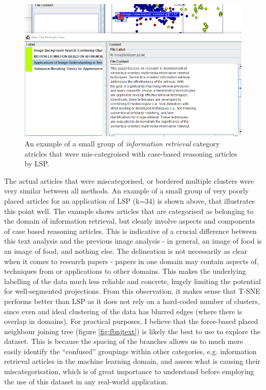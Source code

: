 \documentclass[ 10pt ]{fphw}
\begin{document}
\begin{center}
\begin{figure}[H]
    \centering
	\includegraphics[width=0.85\columnwidth]{example overlap text lsp.png} 
	\caption{An example of a small group of \textit{information retrieval} category atricles that were mis-categroised with case-based reasoning articles by LSP.}
	\label{fig:mixeduptext}
	\end{figure}
\end{center}

The actual articles that were miscategorised, or bordered multiple clusters were very similar between all methods. An example of a small group of very poorly placed articles for an application of LSP (k=34) is shown above, that illustrates this point well. The example shows articles that are categorised as belonging to the domain of information retrieval, but clearly involve aspects and components of case based reasoning articles. This is indicative of a crucial difference between this text analysis and the previous image analysis - in general, an image of food is an image of food, and nothing else. The delineation is not necessarily as clear when it comes to research papers - papers in one domain may contain aspects of, techniques from or applications to other domains. This makes the underlying labelling of the data much less reliable and concrete, hugely limiting the potential for well-segmented projections. From this observation, it makes sense that T-SNE performs better than LSP as it does not rely on a hard-coded number of clusters, since even and ideal clustering of the data has blurred edges (where there is overlap in domains). For practical purposes, I believe that the force-based placed neighbour joining tree (figure \ref{fig:fbnjtext}) is likely the best to use to explore the dataset. This is because the spacing of the branches allows us to much more easily identify the ``confused'' groupings within other categories, e.g. information retrieval articles in the machine learning domain, and assess what is causing their miscategorisation, which is of great importance to understand before employing the use of this dataset in any real-world application.
\end{document}

